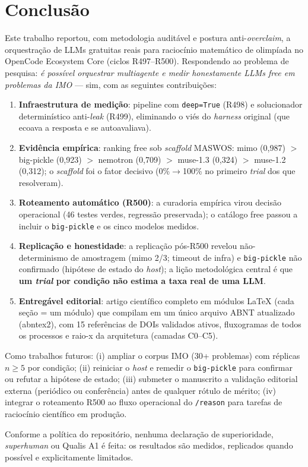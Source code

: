 \chapter{Conclusão}

Este trabalho reportou, com metodologia auditável e postura
anti-\textit{overclaim}, a orquestração de LLMs gratuitas reais para
raciocínio matemático de olimpíada no OpenCode Ecosystem Core (ciclos
R497--R500). Respondendo ao problema de pesquisa: \textit{é possível orquestrar
multiagente e medir honestamente LLMs free em problemas da IMO} --- sim, com
as seguintes contribuições:

\begin{enumerate}
  \item \textbf{Infraestrutura de medição}: pipeline com \texttt{deep=True}
  (R498) e solucionador determinístico anti-\textit{leak} (R499), eliminando o
  viés do \textit{harness} original (que ecoava a resposta e se
  autoavaliava).
  \item \textbf{Evidência empírica}: ranking free sob \textit{scaffold}
  MASWOS: mimo (0,987) $>$ big-pickle (0,923) $>$ nemotron (0,709) $>$
  muse-1.3 (0,324) $>$ muse-1.2 (0,312); o \textit{scaffold} foi o fator
  decisivo (0\%$\rightarrow$100\% no primeiro \textit{trial} dos que
  resolveram).
  \item \textbf{Roteamento automático (R500)}: a curadoria empírica virou
  decisão operacional (46 testes verdes, regressão preservada); o catálogo
  free passou a incluir o \texttt{big-pickle} e os cinco modelos medidos.
  \item \textbf{Replicação e honestidade}: a replicação pós-R500 revelou
  não-determinismo de amostragem (mimo 2/3; timeout de infra) e
  \texttt{big-pickle} não confirmado (hipótese de estado do \textit{host});
  a lição metodológica central é que \textbf{um \textit{trial} por condição
  não estima a taxa real de uma LLM}.
  \item \textbf{Entregável editorial}: artigo científico completo em módulos
  LaTeX (cada seção = um módulo) que compilam em um único arquivo ABNT
  atualizado (abntex2), com 15 referências de DOIs validados ativos,
  fluxogramas de todos os processos e raio-x da arquitetura (camadas
  C0--C5).
\end{enumerate}

Como trabalhos futuros: (i) ampliar o corpus IMO (30+ problemas) com réplicas
$n \geq 5$ por condição; (ii) reiniciar o \textit{host} e remedir o
\texttt{big-pickle} para confirmar ou refutar a hipótese de estado;
(iii) submeter o manuscrito a validação editorial externa (periódico ou
conferência) antes de qualquer rótulo de mérito; (iv) integrar o roteamento
R500 ao fluxo operacional do \texttt{/reason} para tarefas de raciocínio
científico em produção.

Conforme a política do repositório, nenhuma declaração de superioridade,
\textit{superhuman} ou Qualis A1 é feita: os resultados são medidos,
replicados quando possível e explicitamente limitados.